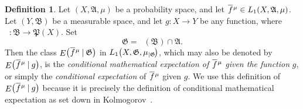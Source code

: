 \documentclass[
twoside=true,
paper=letter,
fontsize=9pt,
pagesize=auto,
leqno,
openany,
headsepline,
overfullrule,
]{scrbook}
\theoremstyle{plain}
\theoremstyle{plain}
\theoremstyle{definition}
\newtheorem{defn}[thm]{Definition}
\theoremstyle{bfnoteitalic}
\theoremstyle{bfnoteroman}
\newcommand{\sigalg}[1]{\mathfrak{#1}}
\newcommand{\given}{\mathbin{\vert}}
\newcommand{\kondexpgvn}[2]
{\mathop{E}\bigl(#1\given#2\bigr)}
\newcommand{\restrictedto}[1]{_{\lvert#1}\kern-1.5pt}
\newcommand{\preimage}[1]{\mathop{#1^{\leftarrow}}}
\newcommand{\meets}{\cap}
\newcommand{\sigmaalgebra}{\sigalg{A}}
\newcommand{\sigmaalgebraii}{\sigalg{B}}
\newcommand{\powerset}{\mathfrak{P}}
\newcommand{\function}{f}
\newcommand{\functionii}{g}
\newcommand{\measurespace}{X}
\newcommand{\measurespaceii}{Y}
\newcommand{\measure}{\mu}
\newcommand*\xbar[1]{%
   \hbox{%
     \vbox{%
       \hrule height 0.4pt %
       \kern0.4ex%
       \hbox{%
         \ensuremath{#1}%
       }%
     }%
   }%
}
\newcommand{\lebclass}[1]{\hspace{.5pt}\xbar{#1}\hspace{0.5pt}}
\newcommand{\ellclass}[2]{\lebclass{#1}^{#2}}
\begin{document}
\begin{defn}\label{cme_function}
Let $(\measurespace, \sigmaalgebra,\measure)$ be a probability space, and let
$\ellclass{\function}{\measure}\in L_1(\measurespace, \sigmaalgebra,\measure)$.
Let $(\measurespaceii, \sigmaalgebraii)$ be a measurable space, and let $\functionii:\measurespace\to\measurespaceii$ be any function, where $\preimage{\functionii}:\sigmaalgebraii\to\powerset(\measurespace)$.
Set
\[
\sigalg{G}
=
\preimage{\functionii}(\sigmaalgebraii)\meets\sigmaalgebra.
\]
Then the class 
$\kondexpgvn{\ellclass{\function}{\measure}}{\sigalg{G}}$
in
$L_1\bigl(\measurespace, \sigalg{G},\measure\restrictedto{\sigalg{G}}\bigr)$, 
which may also be denoted by
$\kondexpgvn{\ellclass{\function}{\measure}}{\functionii}$, is the \emph{conditional mathematical expectation of} $\ellclass{\function}{\measure}$ \emph{given the function} $\functionii$, or simply the \emph{conditional expectation} of $\ellclass{\function}{\measure}$ given $\functionii$.
We use this definition of $\kondexpgvn{\ellclass{\function}{\measure}}{\functionii}$ because it is precisely the definition of conditional mathematical expectation as set down in Kolmogorov~\cite{fottop_kolmogorov_1956}. 


\end{defn}
\end{document}
